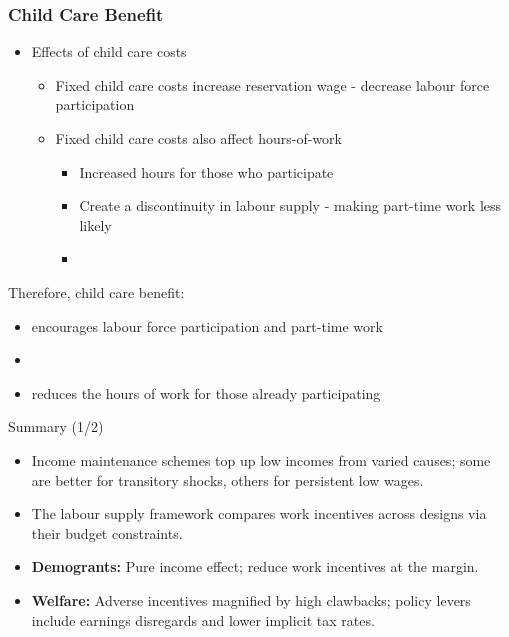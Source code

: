 \documentclass[aspectratio=169]{beamer}
\begin{document}
 
 
  \begin{frame} \frametitle{Child Care Benefit}
\label{Child Care Benefit}

\begin{itemize}


\item Effects of child care costs

\begin{itemize}
\item Fixed child care costs increase reservation wage - decrease labour force participation

\item Fixed child care costs also affect hours-of-work
\begin{itemize}
\item Increased hours for those who participate
\item Create a discontinuity in labour supply -  making part-time work less likely
\item[]
\end{itemize}
\end{itemize}
\end{itemize}

Therefore,  child care benefit:
\begin{itemize}
\item encourages labour force participation and part-time work
\item[]
\item reduces the hours of work for those already participating
 \end{itemize}
 \end{frame}


\begin{frame}{Summary (1/2)}
\transfade
\begin{itemize}
  \item Income maintenance schemes top up low incomes from varied causes; some are better for transitory shocks, others for persistent low wages.
  \item The labour supply framework compares work incentives across designs via their budget constraints.
  \item \textbf{Demogrants:} Pure income effect; reduce work incentives at the margin.
  \item \textbf{Welfare:} Adverse incentives magnified by high clawbacks; policy levers include earnings disregards and lower implicit tax rates.
\end{itemize}
\end{frame}
\end{document}
